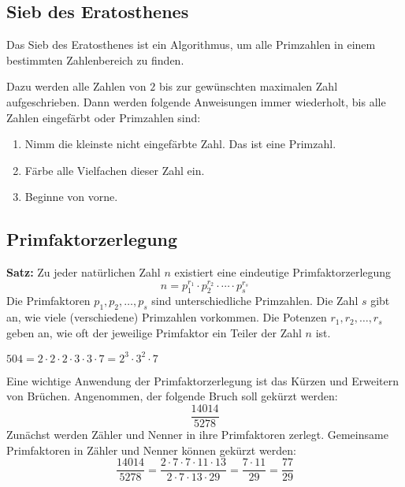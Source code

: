 \subsection{Sieb des Eratosthenes}

Das Sieb des Eratosthenes ist ein Algorithmus, um alle Primzahlen in einem bestimmten Zahlenbereich zu finden.

Dazu werden alle Zahlen von $2$ bis zur gewünschten maximalen Zahl aufgeschrieben. Dann werden folgende Anweisungen immer wiederholt, bis alle Zahlen eingefärbt oder Primzahlen sind:
\begin{enumerate}
  \item Nimm die kleinste nicht eingefärbte Zahl. Das ist eine Primzahl.
  \item Färbe alle Vielfachen dieser Zahl ein.
  \item Beginne von vorne.
\end{enumerate}

\newpage
\subsection{Primfaktorzerlegung}

\begin{theorem}
  \textbf{Satz:} Zu jeder natürlichen Zahl $n$ existiert eine eindeutige Primfaktorzerlegung
  \[
    n = p_{1}^{r_{1}} \cdot p_{2}^{r_{2}} \cdot \cdots \cdot p_{s}^{r_{s}}
  \]
  Die Primfaktoren $p_{1}, p_{2}, \ldots, p_{s}$ sind unterschiedliche Primzahlen. Die Zahl $s$ gibt an, wie viele (verschiedene) Primzahlen vorkommen. Die Potenzen $r_{1}, r_{2},\ldots, r_{s}$ geben an, wie oft der jeweilige Primfaktor ein Teiler der Zahl $n$ ist.
\end{theorem}
\begin{example}
  $504 = 2\cdot 2\cdot 2\cdot 3\cdot 3\cdot 7 = 2^{3}\cdot 3^{2}\cdot 7$
\end{example}
Eine wichtige Anwendung der Primfaktorzerlegung ist das Kürzen und Erweitern von Brüchen. Angenommen, der folgende Bruch soll gekürzt werden:
\[
  \frac{14014}{5278}
\]
Zunächst werden Zähler und Nenner in ihre Primfaktoren zerlegt. Gemeinsame Primfaktoren in Zähler und Nenner können gekürzt werden:
\[
  \frac{14014}{5278} = \frac{2\cdot 7\cdot 7\cdot 11\cdot 13}{2\cdot 7\cdot 13\cdot 29} = \frac{7\cdot 11}{29} = \frac{77}{29}
\]

